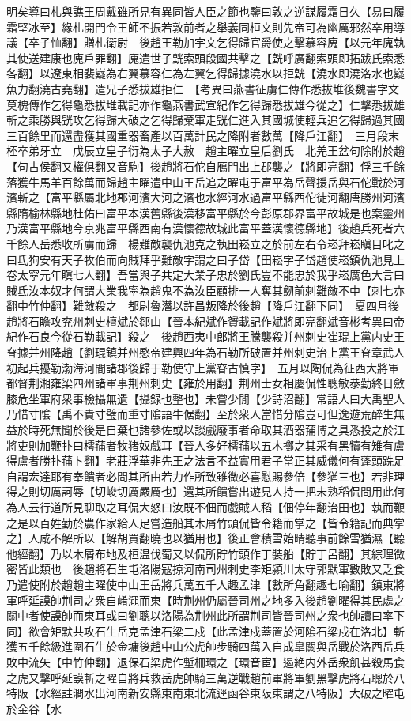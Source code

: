明矣導曰札與譙王周戴雖所見有異同皆人臣之節也鑒曰敦之逆謀履霜日久【易曰履霜堅冰至】緣札開門令王師不振若敦前者之舉義同桓文則先帝可為幽厲邪然卒用導議【卒子恤翻】贈札衛尉　後趙王勒加宇文乞得歸官爵使之擊慕容廆【以元年廆執其使送建康也廆戶罪翻】廆遣世子皝索頭段國共擊之【皝呼廣翻索頭即拓跋氏索悉各翻】以遼東相裴嶷為右翼慕容仁為左翼乞得歸據澆水以拒皝【澆水即澆洛水也嶷魚力翻澆古堯翻】遣兄子悉拔雄拒仁　【考異曰燕書征虜仁傳作悉拔堆後魏書字文莫槐傳作乞得龜悉拔堆載記亦作龜燕書武宣紀作乞得歸悉拔雄今從之】仁擊悉拔雄斬之乘勝與皝攻乞得歸大破之乞得歸棄軍走皝仁進入其國城使輕兵追乞得歸過其國三百餘里而還盡獲其國重器畜產以百萬計民之降附者數萬【降戶江翻】　三月段末柸卒弟牙立　戊辰立皇子衍為太子大赦　趙主曜立皇后劉氏　北羌王盆句除附於趙【句古侯翻又權俱翻又音駒】後趙將石佗自鴈門出上郡襲之【將即亮翻】俘三千餘落獲牛馬羊百餘萬而歸趙主曜遣中山王岳追之曜屯于富平為岳聲援岳與石佗戰於河濱斬之【富平縣屬北地郡河濱大河之濱也水經河水過富平縣西佗徒河翻唐勝州河濱縣隋榆林縣地杜佑曰富平本漢舊縣後漢移富平縣於今彭原郡界富平故城是也案靈州乃漢富平縣地今京兆富平縣西南有漢懷德故城此富平蓋漢懷德縣地】後趙兵死者六千餘人岳悉收所虜而歸　楊難敵襲仇池克之執田崧立之於前左右令崧拜崧瞋目叱之曰氐狗安有天子牧伯而向賊拜乎難敵字謂之曰子岱【田崧字子岱趙使崧鎮仇池見上卷太寜元年瞋七人翻】吾當與子共定大業子忠於劉氏豈不能忠於我乎崧厲色大言曰賊氐汝本奴才何謂大業我寜為趙鬼不為汝臣顧排一人奪其劒前刺難敵不中【刺七亦翻中竹仲翻】難敵殺之　都尉魯潛以許昌叛降於後趙【降戶江翻下同】　夏四月後趙將石瞻攻兖州刺史檀斌於鄒山【晉本紀斌作贇載記作斌將即亮翻斌音彬考異曰帝紀作石良今從石勒載記】殺之　後趙西夷中郎將王騰襲殺并州刺史崔琨上黨内史王眘據并州降趙【劉琨鎮并州愍帝建興四年為石勒所破置并州刺史治上黨王眘章武人初起兵擾勒渤海河間諸郡後歸于勒使守上黨眘古慎字】　五月以陶侃為征西大將軍都督荆湘雍梁四州諸軍事荆州刺史【雍於用翻】荆州士女相慶侃性聰敏㳟勤終日斂膝危坐軍府衆事檢攝無遺【攝録也整也】未嘗少閒【少詩沼翻】常語人曰大禹聖人乃惜寸隂【禹不貴寸璧而重寸隂語牛倨翻】至於衆人當惜分隂豈可但逸遊荒醉生無益於時死無聞於後是自棄也諸參佐或以談戲廢事者命取其酒器蒱博之具悉投之於江將吏則加鞭扑曰樗蒱者牧猪奴戲耳【晉人多好樗蒱以五木擲之其采有黑犢有雉有盧得盧者勝扑蒱卜翻】老莊浮華非先王之法言不益實用君子當正其威儀何有蓬頭跣足自謂宏達耶有奉饋者必問其所由若力作所致雖微必喜慰賜參倍【參猶三也】若非理得之則切厲訶辱【切峻切厲嚴厲也】還其所饋嘗出遊見人持一把未熟稻侃問用此何為人云行道所見聊取之耳侃大怒曰汝既不佃而戲賊人稻【佃停年翻治田也】執而鞭之是以百姓勤於農作家給人足嘗造船其木屑竹頭侃皆令籍而掌之【皆令籍記而典掌之】人咸不解所以【解胡買翻曉也以猶用也】後正會積雪始晴聽事前餘雪猶濕【聽他經翻】乃以木屑布地及桓温伐蜀又以侃所貯竹頭作丁裝船【貯丁呂翻】其綜理微密皆此類也　後趙將石生屯洛陽寇掠河南司州刺史李矩潁川太守郭默軍數敗又乏食乃遣使附於趙趙主曜使中山王岳將兵萬五千人趣孟津【數所角翻趣七喻翻】鎮東將軍呼延謨帥荆司之衆自崤澠而東【時荆州仍屬晉司州之地多入後趙劉曜得其民處之關中者使謨帥而東耳或曰劉聰以洛陽為荆州此所謂荆司皆晉司州之衆也帥讀曰率下同】欲會矩默共攻石生岳克孟津石梁二戍【此孟津戍蓋置於河隂石梁戍在洛北】斬獲五千餘級進圍石生於金墉後趙中山公虎帥步騎四萬入自成臯關與岳戰於洛西岳兵敗中流矢【中竹仲翻】退保石梁虎作塹柵環之【環音宦】遏絶内外岳衆飢甚殺馬食之虎又擊呼延謨斬之曜自將兵救岳虎帥騎三萬逆戰趙前軍將軍劉黑擊虎將石聰於八特阪【水經註澗水出河南新安縣東南東北流逕函谷東阪東謂之八特阪】大破之曜屯於金谷【水